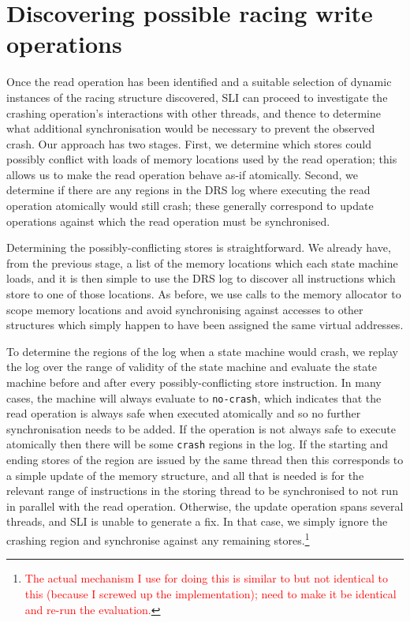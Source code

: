 \documentclass[10pt,twocolumn,preprint,natbib,authoryear]{sigplanconf}
\newcommand{\editorial}[1]{\textcolor{red}{\footnote{\textcolor{red}{#1}}}}
\begin{document}
\section{Discovering possible racing write operations}
\label{sect:multi_threading}

Once the read operation has been identified and a suitable selection
of dynamic instances of the racing structure discovered, SLI can
proceed to investigate the crashing operation's interactions with
other threads, and thence to determine what additional synchronisation
would be necessary to prevent the observed crash.  Our approach has
two stages.  First, we determine which stores could possibly conflict
with loads of memory locations used by the read operation; this allows
us to make the read operation behave as-if atomically.  Second, we
determine if there are any regions in the DRS log where executing the
read operation atomically would still crash; these generally
correspond to update operations against which the read operation must
be synchronised.

Determining the possibly-conflicting stores is straightforward.  We
already have, from the previous stage, a list of the memory locations
which each state machine loads, and it is then simple to use the DRS
log to discover all instructions which store to one of those
locations.  As before, we use calls to the memory allocator to scope
memory locations and avoid synchronising against accesses to other
structures which simply happen to have been assigned the same virtual
addresses.

To determine the regions of the log when a state machine would crash,
we replay the log over the range of validity of the state machine and
evaluate the state machine before and after every possibly-conflicting
store instruction.  In many cases, the machine will always evaluate to
\verb|no-crash|, which indicates that the read operation is always
safe when executed atomically and so no further synchronisation needs
to be added.  If the operation is not always safe to execute
atomically then there will be some \verb|crash| regions in the log.
If the starting and ending stores of the region are issued by the same
thread then this corresponds to a simple update of the memory
structure, and all that is needed is for the relevant range of
instructions in the storing thread to be synchronised to not run in
parallel with the read operation.  Otherwise, the update operation
spans several threads, and SLI is unable to generate a fix.  In that
case, we simply ignore the crashing region and synchronise against any
remaining stores.\editorial{The actual mechanism I use for doing this
  is similar to but not identical to this (because I screwed up the
  implementation); need to make it be identical and re-run the
  evaluation.}
\end{document}

